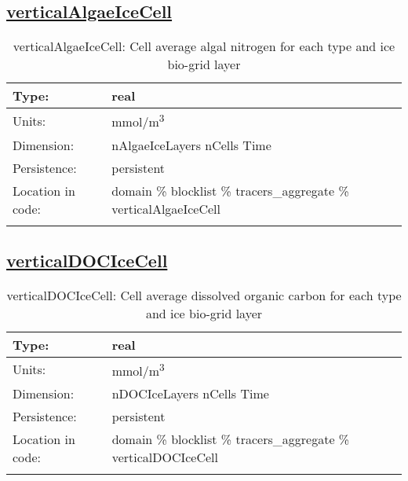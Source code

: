 \subsection[verticalAlgaeIceCell]{\hyperref[sec:var_tab_tracers_aggregate]{verticalAlgaeIceCell}}
\label{subsec:var_sec_tracers_aggregate_verticalAlgaeIceCell}
\begin{center}
\begin{longtable}{| p{2.0in} | p{4.0in} |}
        \hline 
        Type: & real \\
        \hline 
        Units: & \si{mmol/m^3} \\
        \hline 
        Dimension: & nAlgaeIceLayers nCells Time \\
        \hline 
        Persistence: & persistent \\
        \hline 
         Location in code: & domain \% blocklist \% tracers\_aggregate \% verticalAlgaeIceCell \\
         \hline 
    \caption{verticalAlgaeIceCell: Cell average algal nitrogen for each type and ice bio-grid layer}
\end{longtable}
\end{center}
\subsection[verticalDOCIceCell]{\hyperref[sec:var_tab_tracers_aggregate]{verticalDOCIceCell}}
\label{subsec:var_sec_tracers_aggregate_verticalDOCIceCell}
\begin{center}
\begin{longtable}{| p{2.0in} | p{4.0in} |}
        \hline 
        Type: & real \\
        \hline 
        Units: & \si{mmol/m^3} \\
        \hline 
        Dimension: & nDOCIceLayers nCells Time \\
        \hline 
        Persistence: & persistent \\
        \hline 
         Location in code: & domain \% blocklist \% tracers\_aggregate \% verticalDOCIceCell \\
         \hline 
    \caption{verticalDOCIceCell: Cell average dissolved organic carbon for each type and ice bio-grid layer}
\end{longtable}
\end{center}

